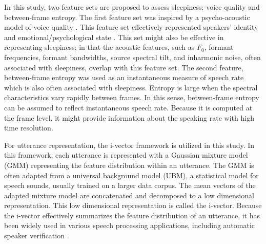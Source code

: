 In this study, two feature sets are proposed to assess sleepiness: voice quality and between-frame entropy. 
The first feature set was inspired by a psycho-acoustic model of voice quality \cite{Kreiman2014, Garellek2016}. %
This feature set effectively represented speakers' identity \cite{kreiman2015relationship, Park2016, Park2017, Park2018JASA} and emotional/psychological state \cite{Park2018IS, afshan2018effectiveness}.
This set might also be effective in representing sleepiness; in that the acoustic features, such as $F_0$, formant frequencies, formant bandwidths, source spectral tilt, and inharmonic noise, often associated with sleepiness, overlap with this feature set.
The second feature, between-frame entropy was used as an instantaneous measure of speech rate which is also often associated with sleepiness.
Entropy is large when the spectral characteristics vary rapidly between frames. In this sense, between-frame entropy can be assumed to reflect instantaneous speech rate. 
Because it is computed at the frame level, it might provide information about the speaking rate with high time resolution. 

For utterance representation, the i-vector framework \cite{dehak2011front} is utilized in this study. In this framework, each utterance is represented with a Gaussian mixture model (GMM) representing the feature distribution within an utterance. The GMM is often adapted from a universal background model (UBM), a statistical model for speech sounds, usually trained on a larger data corpus. The mean vectors of the adapted mixture model are concatenated and decomposed to a low dimensional representation. This low dimensional representation is called the i-vector.
Because the i-vector effectively summarizes the feature distribution of an utterance, it has been widely used in various speech processing applications, including automatic speaker verification \cite{Hansen2015}.

